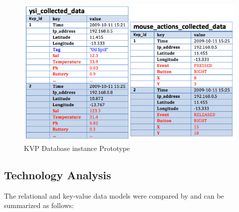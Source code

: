 \begin{figure}[!h]
  \centering
  \includegraphics[scale=0.75]{../diagrams/persistence-example-kvp}
  \caption{KVP Database instance Prototype}
  \label{fig:persistence-example-kvp}
\end{figure}

\subsection{Technology Analysis}

The relational and key-value data models were compared by
\cite{db-is-rdbs-dommed} and can be summarized as follows:

